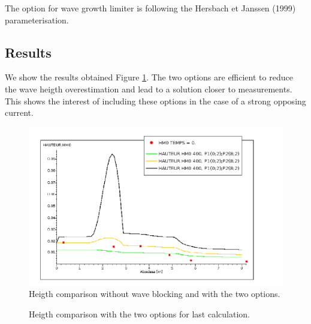 The option for wave growth limiter is following the Hersbach et Janssen (1999) parameterisation.

%
%
\subsection{Results}
%
We show the results obtained Figure \ref{reswaveblocking}. The two options are efficient to reduce the wave heigth overestimation and lead to a solution closer to measurements. This shows the interest of including these options in the case of a strong opposing current.

\begin{figure} [!h]
\centering
\includegraphics[scale = 0.4]{hauteur.png}
 \caption{Heigth comparison without wave blocking and with the two options.}
\label{reswaveblocking}
\end{figure}

\begin{figure} [!h]
\centering
{}
 \caption{Heigth comparison with the two options for last calculation.}
\label{reswaveblocking2}
\end{figure}




